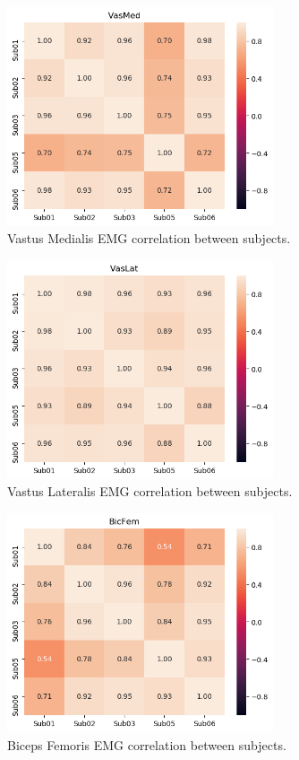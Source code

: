 \begin{figure}[ht!]
    \centering
    \includegraphics[width=0.7\textwidth]{img/results/correlations/VasMed_correlation_between_subjects.png}
    \caption{Vastus Medialis \ac{EMG} correlation between subjects.}
    \label{fig:vasmed-correlation}
\end{figure}
\begin{figure}[ht!]
    \centering
    \includegraphics[width=0.7\textwidth]{img/results/correlations/VasLat_correlation_between_subjects.png}
    \caption{Vastus Lateralis \ac{EMG} correlation between subjects.}
    \label{fig:vaslat-correlation}
\end{figure}
\begin{figure}[ht!]
    \centering
    \includegraphics[width=0.7\textwidth]{img/results/correlations/BicFem_correlation_between_subjects.png}
    \caption{Biceps Femoris \ac{EMG} correlation between subjects.}
    \label{fig:bicfem-correlation}
\end{figure}
